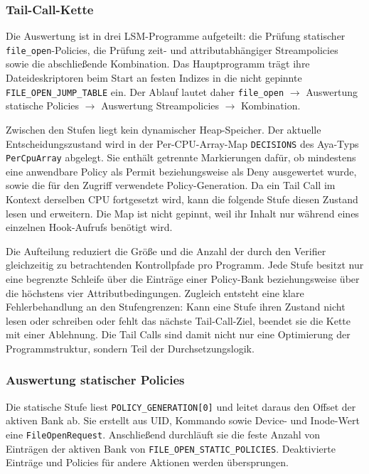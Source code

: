 \subsubsection{Tail-Call-Kette}
Die Auswertung ist in drei LSM-Programme aufgeteilt: die Prüfung statischer \texttt{file\_open}-Policies, die Prüfung zeit- und attributabhängiger Streampolicies sowie die abschließende Kombination. Das Hauptprogramm trägt ihre Dateideskriptoren beim Start an festen Indizes in die nicht gepinnte \texttt{FILE\_OPEN\_JUMP\_TABLE} ein. Der Ablauf lautet daher \texttt{file\_open} $\rightarrow$ Auswertung statische Policies $\rightarrow$ Auswertung Streampolicies $\rightarrow$ Kombination.

Zwischen den Stufen liegt kein dynamischer Heap-Speicher. Der aktuelle Entscheidungszustand wird in der Per-CPU-Array-Map \texttt{DECISIONS} des Aya-Typs \texttt{PerCpuArray} abgelegt. Sie enthält getrennte Markierungen dafür, ob mindestens eine anwendbare Policy als Permit beziehungsweise als Deny ausgewertet wurde, sowie die für den Zugriff verwendete Policy-Generation. Da ein Tail Call im Kontext derselben CPU fortgesetzt wird, kann die folgende Stufe diesen Zustand lesen und erweitern. Die Map ist nicht gepinnt, weil ihr Inhalt nur während eines einzelnen Hook-Aufrufs benötigt wird.

Die Aufteilung reduziert die Größe und die Anzahl der durch den Verifier gleichzeitig zu betrachtenden Kontrollpfade pro Programm. Jede Stufe besitzt nur eine begrenzte Schleife über die Einträge einer Policy-Bank beziehungsweise über die höchstens vier Attributbedingungen. Zugleich entsteht eine klare Fehlerbehandlung an den Stufengrenzen: Kann eine Stufe ihren Zustand nicht lesen oder schreiben oder fehlt das nächste Tail-Call-Ziel, beendet sie die Kette mit einer Ablehnung. Die Tail Calls sind damit nicht nur eine Optimierung der Programmstruktur, sondern Teil der Durchsetzungslogik.

\subsubsection{Auswertung statischer Policies}
Die statische Stufe liest \texttt{POLICY\_GENERATION[0]} und leitet daraus den Offset der aktiven Bank ab. Sie erstellt aus UID, Kommando sowie Device- und Inode-Wert eine \texttt{FileOpenRequest}. Anschließend durchläuft sie die feste Anzahl von Einträgen der aktiven Bank von \texttt{FILE\_OPEN\_STATIC\_POLICIES}. Deaktivierte Einträge und Policies für andere Aktionen werden übersprungen.

